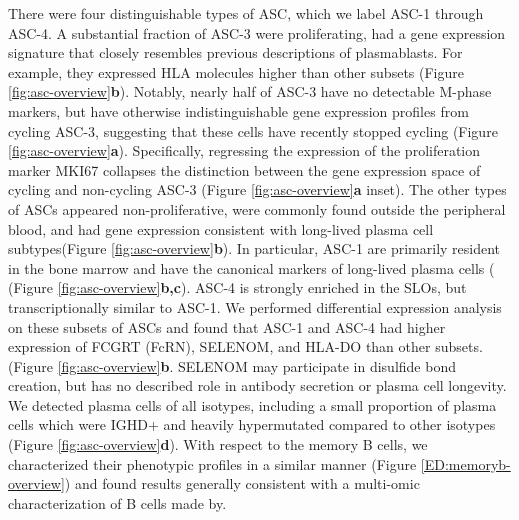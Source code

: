 There were four distinguishable types of ASC, which we label ASC-1 through ASC-4. A substantial fraction of ASC-3 were proliferating, had a gene expression signature that closely resembles previous descriptions of plasmablasts. For example, they expressed HLA molecules higher than other subsets (Figure \ref{fig:asc-overview}\textbf{b})\cite{sanz2019challenges}. Notably, nearly half of ASC-3 have no detectable M-phase markers, but have otherwise indistinguishable gene expression profiles from cycling ASC-3, suggesting that these cells have recently stopped cycling (Figure \ref{fig:asc-overview}\textbf{a}). Specifically, regressing the expression of the proliferation marker MKI67 collapses the distinction between the gene expression space of cycling and non-cycling ASC-3 (Figure \ref{fig:asc-overview}\textbf{a} inset). The other types of ASCs appeared non-proliferative, were commonly found outside the peripheral blood, and had gene expression consistent with long-lived plasma cell subtypes\cite{sanz2019challenges}(Figure \ref{fig:asc-overview}\textbf{b}). In particular, ASC-1 are primarily resident in the bone marrow and have the canonical markers of long-lived plasma cells (\cite{halliley2015long} (Figure \ref{fig:asc-overview}\textbf{b,c}). ASC-4 is strongly enriched in the SLOs, but transcriptionally similar to ASC-1. We performed differential expression analysis on these subsets of ASCs and found that ASC-1 and ASC-4 had higher expression of FCGRT (FcRN), SELENOM, and HLA-DO than other subsets. (Figure \ref{fig:asc-overview}\textbf{b}. SELENOM may participate in disulfide bond creation, but has no described role in antibody secretion or plasma cell longevity. We detected plasma cells of all isotypes, including a small proportion of plasma cells which were IGHD+ and heavily hypermutated compared to other isotypes (Figure \ref{fig:asc-overview}\textbf{d}). With respect to the memory B cells, we characterized their phenotypic profiles in a similar manner (Figure \ref{ED:memoryb-overview}) and found results generally consistent with a multi-omic characterization of B cells made by\cite{glass2020integrated}.

